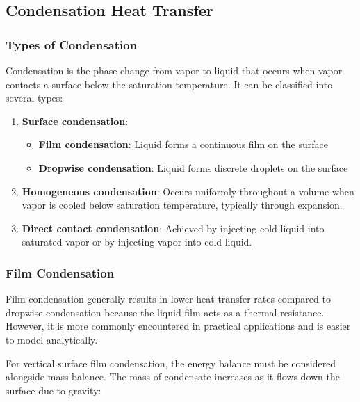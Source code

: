 \subsection*{Condensation Heat Transfer}
\subsubsection*{Types of Condensation}
Condensation is the phase change from vapor to liquid that occurs when vapor contacts a surface below the saturation temperature. It can be classified into several types:

\begin{enumerate}
    \item \textbf{Surface condensation}:
       \begin{itemize}
           \item \textbf{Film condensation}: Liquid forms a continuous film on the surface
           \item \textbf{Dropwise condensation}: Liquid forms discrete droplets on the surface
       \end{itemize}

    \item \textbf{Homogeneous condensation}: Occurs uniformly throughout a volume when vapor is cooled below saturation temperature, typically through expansion.

    \item \textbf{Direct contact condensation}: Achieved by injecting cold liquid into saturated vapor or by injecting vapor into cold liquid.
\end{enumerate}
\subsubsection*{Film Condensation}
Film condensation generally results in lower heat transfer rates compared to dropwise condensation because the liquid film acts as a thermal resistance. However, it is more commonly encountered in practical applications and is easier to model analytically.

For vertical surface film condensation, the energy balance must be considered alongside mass balance. The mass of condensate increases as it flows down the surface due to gravity:

